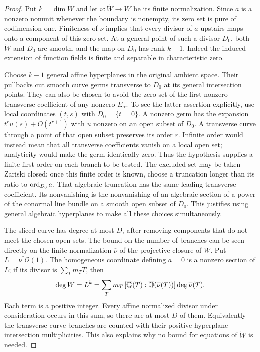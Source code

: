 \begin{proof}
Put $k=\dim W$ and let $\nu:\widetilde W\to W$ be its finite
normalization.  Since $a$ is a nonzero nonunit whenever the boundary is
nonempty, its zero set is pure of codimension one.  Finiteness of $\nu$
implies that every divisor of $a$ upstairs maps onto a component of this
zero set.  At a general point of such a divisor $D_0$, both
$\widetilde W$ and $D_0$ are smooth, and the map on $D_0$ has rank $k-1$.
Indeed the induced extension of function fields is finite and separable
in characteristic zero.

Choose $k-1$ general affine hyperplanes in the original ambient space.
Their pullbacks cut smooth curve germs transverse to $D_0$ at its general
intersection points.  They can also be chosen to avoid the zero set of
the first nonzero transverse coefficient of any nonzero $E_\alpha$.
To see the latter assertion explicitly, use local coordinates $(t,s)$
with $D_0=\{t=0\}$.  A nonzero germ has the expansion
$t^r u(s)+O(t^{r+1})$ with $u$ nonzero on an open subset of $D_0$.
A transverse curve through a point of that open subset preserves its
order $r$.  Infinite order would instead mean that all transverse
coefficients vanish on a local open set; analyticity would make the
germ identically zero.  Thus the hypothesis supplies a finite first
order on each branch to be tested.  The excluded set may be taken
Zariski closed: once this finite order is known, choose a truncation
longer than its ratio to $\operatorname{ord}_{D_0}a$.  That algebraic truncation
has the same leading transverse coefficient.  Its nonvanishing is
the nonvanishing of an algebraic section of a power of the conormal
line bundle on a smooth open subset of $D_0$.  This justifies using
general algebraic hyperplanes to make all these choices simultaneously.

The sliced curve has degree at most $D$, after removing components that
do not meet the chosen open sets.  The bound on the number of branches
can be seen directly on the finite normalization $\overline\nu$ of the
projective closure of $W$.  Put $L=\overline\nu^*\mathcal O(1)$.
The homogeneous coordinate defining $a=0$ is a nonzero section of $L$;
if its divisor is $\sum_T m_TT$, then
\[
 \deg W=L^k
   =\sum_T m_T\,[\overline{\mathbb Q}(T):\overline{\mathbb Q}(\overline\nu(T))]
                     \deg\overline\nu(T).
\]
Each term is a positive integer.  Every affine normalized divisor
under consideration occurs in this sum, so there are at most $D$ of
them.  Equivalently the transverse curve branches are counted with
their positive hyperplane-intersection multiplicities.  This also
explains why no bound for equations of $\widetilde W$ is needed.


\end{proof}
